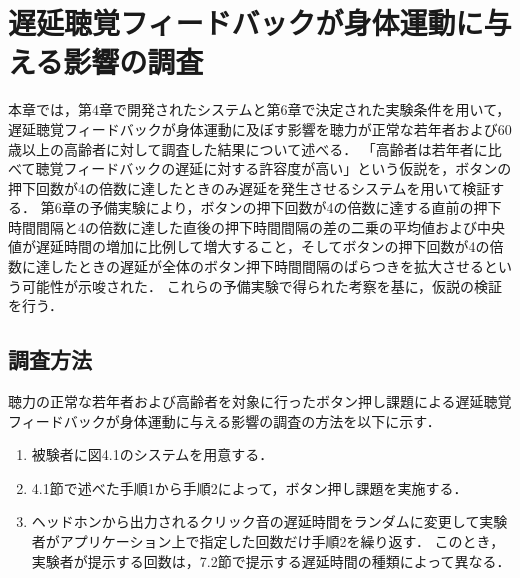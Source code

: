 \chapter{遅延聴覚フィードバックが身体運動に与える影響の調査}
本章では，第4章で開発されたシステムと第6章で決定された実験条件を用いて，遅延聴覚フィードバックが身体運動に及ぼす影響を聴力が正常な若年者および60歳以上の高齢者に対して調査した結果について述べる．
「高齢者は若年者に比べて聴覚フィードバックの遅延に対する許容度が高い」という仮説を，ボタンの押下回数が4の倍数に達したときのみ遅延を発生させるシステムを用いて検証する．
第6章の予備実験により，ボタンの押下回数が4の倍数に達する直前の押下時間間隔と4の倍数に達した直後の押下時間間隔の差の二乗の平均値および中央値が遅延時間の増加に比例して増大すること，そしてボタンの押下回数が4の倍数に達したときの遅延が全体のボタン押下時間間隔のばらつきを拡大させるという可能性が示唆された．
これらの予備実験で得られた考察を基に，仮説の検証を行う．
\section{調査方法}
聴力の正常な若年者および高齢者を対象に行ったボタン押し課題による遅延聴覚フィードバックが身体運動に与える影響の調査の方法を以下に示す．
\begin{enumerate}[leftmargin=*]
  \item 被験者に図4.1のシステムを用意する．
  \item 4.1節で述べた手順1から手順2によって，ボタン押し課題を実施する．
  \item ヘッドホンから出力されるクリック音の遅延時間をランダムに変更して実験者がアプリケーション上で指定した回数だけ手順2を繰り返す．
  このとき，実験者が提示する回数は，7.2節で提示する遅延時間の種類によって異なる．
\end{enumerate}
